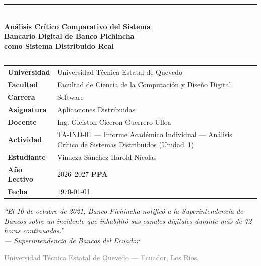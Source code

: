 \documentclass[12pt,a4paper]{article}
\begin{document}
\begin{titlepage}
  \centering
  \vspace*{0.5cm}

  {\color{azulP}\rule{\linewidth}{2pt}}\\[0.4cm]
  {\LARGE\bfseries\color{azulP}
    An\'alisis Cr\'itico Comparativo del Sistema\\[0.25cm]
    Bancario Digital de Banco Pichincha\\[0.2cm]
    como Sistema Distribuido Real}\\[0.35cm]
  {\color{azulP}\rule{\linewidth}{2pt}}

  \vspace{1.2cm}

  \begin{tcolorbox}[colback=grisClaro, colframe=azulP, arc=4mm,
                    title={\bfseries Informaci\'on Acad\'emica e Institucional}]
    \renewcommand{\arraystretch}{1.35}
    \begin{tabular}{@{} p{4.5cm} p{8.5cm} @{}}
      \textbf{Universidad}   & Universidad T\'ecnica Estatal de Quevedo \\
      \textbf{Facultad}      & Facultad de Ciencia de la Computaci\'on y Dise\~no Digital \\
      \textbf{Carrera}       & Software \\
      \textbf{Asignatura}    & Aplicaciones Distribuidas \\
      \textbf{Docente}       & Ing. Gleiston Ciceron Guerrero Ulloa \\
      \textbf{Actividad}     & TA-IND-01 --- Informe Acad\'emico Individual --- An\'alisis Cr\'itico de Sistemas Distribuidos (Unidad~1) \\
      \textbf{Estudiante}    & Vinueza S\'anchez Harold N\'icolas \\
      \textbf{A\~no Lectivo} & 2026--2027 \textbf{PPA} \\
      \textbf{Fecha}         & \today \\
    \end{tabular}
  \end{tcolorbox}

  \vspace{1cm}

  \begin{tcolorbox}[colback=azulP!8, colframe=azulP, arc=4mm, width=0.92\linewidth]
    \centering\small\itshape
    ``El 10 de octubre de 2021, Banco Pichincha notific\'o a la Superintendencia de
    Bancos sobre un incidente que inhabilit\'o sus canales digitales durante m\'as
    de 72 horas continuadas.''\\[0.25cm]
    \upshape\small --- Superintendencia de Bancos del Ecuador \cite{SuperbancosIncidente2021}
  \end{tcolorbox}

  \vfill
  {\small\textcolor{gray}{Universidad T\'ecnica Estatal de Quevedo --- Ecuador, Los R\'ios, \the\year}}
\end{titlepage}
\end{document}
